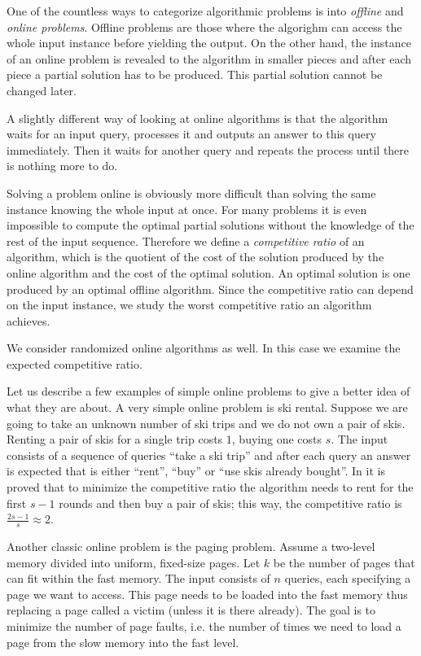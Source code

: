 One of the countless ways to categorize algorithmic problems is into
\emph{offline} and \emph{online problems}. Offline problems are those
where the algorighm can access the whole input instance before yielding
the output.  On the other hand, the instance of an online problem is
revealed to the algorithm in smaller pieces and after each piece a partial
solution has to be produced. This partial solution cannot be changed
later.

A slightly different way of looking at online algorithms is that the
algorithm waits for an input query, processes it and outputs an answer to
this query immediately. Then it waits for another query and repeats the
process until there is nothing more to do.

Solving a problem online is obviously more difficult than solving the same
instance knowing the whole input at once. For many problems it is even
impossible to compute the optimal partial solutions without the knowledge
of the rest of the input sequence. Therefore we define a \emph{competitive
ratio} of an algorithm, which is the quotient of the cost of the solution
produced by the online algorithm and the cost of the optimal solution. An
optimal solution is one produced by an optimal offline algorithm. Since
the competitive ratio can depend on the input instance, we study the worst
competitive ratio an algorithm achieves.

We consider randomized online algorithms as well. In this case we examine
the expected competitive ratio.

Let us describe a few examples of simple online problems to give a better
idea of what they are about. A very simple online problem is ski rental.
Suppose we are going to take an unknown number of ski trips and we do not
own a pair of skis. Renting a pair of skis for a single trip costs $1$,
buying one costs $s$. The input consists of a sequence of queries ``take a
ski trip'' and after each query an answer is expected that is either
``rent'', ``buy'' or ``use skis already bought''. In \cite{skirental} it
is proved that to minimize the competitive ratio the algorithm needs to
rent for the first $s-1$ rounds and then buy a pair of skis; this way, the
competitive ratio is $\frac{2s-1}{s} \approx 2$.

Another classic online problem is the paging problem. Assume a two-level
memory divided into uniform, fixed-size pages. Let $k$ be the number of
pages that can fit within the fast memory. The input consists of $n$
queries, each specifying a page we want to access. This page needs to be
loaded into the fast memory thus replacing a page called a victim (unless
it is there already). The goal is to minimize the number of page faults,
i.e. the number of times we need to load a page from the slow memory into
the fast level.

